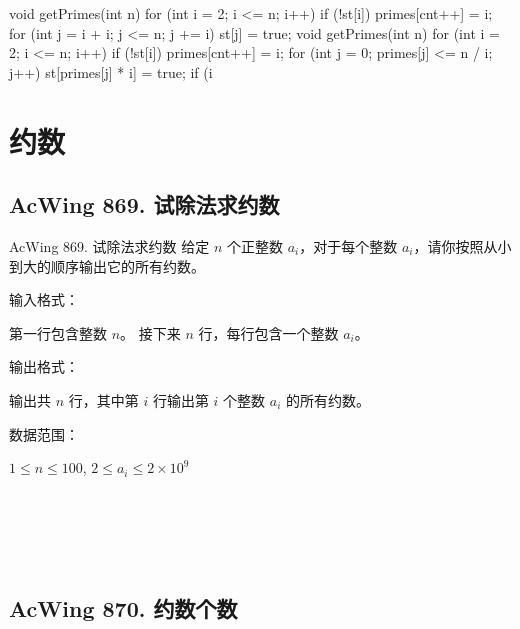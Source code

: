 \begin{mycpptwocol}[埃氏筛法和线性筛法]
    void getPrimes(int n) {
        for (int i = 2; i <= n; i++) {
            if (!st[i]) {
                primes[cnt++] = i;
                for (int j = i + i; j <= n; j += i) {
                    st[j] = true;
                }
            }
        }
    }
    void getPrimes(int n) {
        for (int i = 2; i <= n; i++) {
            if (!st[i]) primes[cnt++] = i;
            for (int j = 0; primes[j] <= n / i; j++) {
                st[primes[j] * i] = true;
                if (i %
            }
        }
    }
\end{mycpptwocol}


\section{约数}

\subsection{AcWing 869. 试除法求约数}
\begin{titledbox}{AcWing 869. 试除法求约数}
    给定 $n$ 个正整数 $a_i$，对于每个整数 $a_i$，请你按照从小到大的顺序输出它的所有约数。

    输入格式：

    第一行包含整数 $n$。 接下来 $n$ 行，每行包含一个整数 $a_i$。

    输出格式：

    输出共 $n$ 行，其中第 $i$ 行输出第 $i$ 个整数 $a_i$ 的所有约数。

    数据范围：

    $1 \le n \le 100$, $2 \le a_i \le 2 \times 10^9$

    \begin{inputblock}
         \\
         \\
    \end{inputblock}
    \begin{outputblock}
         \\
    \end{outputblock}
\end{titledbox}

\subsection{AcWing 870. 约数个数}

